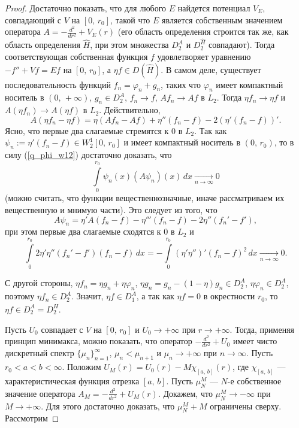 \documentclass[a4paper
]{article}
\begin{document}
\begin{proof}
Достаточно показать, что для любого $E$ найдется потенциал $V_E$,
совпадающий с $V$ на $[0, \, r_0]$, такой что $E$ является
собственным значением оператора $A=-\frac{d^2}{dr^2}+V_E(r)$ (его
область определения строится так же, как область определения $\hat
H$, при этом множества $D_2^A$ и $D_2^{\hat H}$ совпадают). Тогда
соответствующая собственная функция $f$ удовлетворяет уравнению
$-f''+Vf=Ef$ на $[0, \, r_0]$, а $\eta f\in D(\hat H)$. В самом
деле, существует последовательность функций $f_n=\varphi_n+g_n$,
таких что $\varphi_n$ имеет компактный носитель в $(0, \,
+\infty)$, $g_n\in D_2^A$, $f_n\rightarrow f$, $Af_n\rightarrow
Af$ в $L_2$. Тогда $\eta f_n\rightarrow \eta f$ и $A(\eta
f_n)\rightarrow A(\eta f)$ в $L_2$. Действительно, $$A(\eta f_n-
\eta f)=\eta (Af_n-Af)+\eta''(f_n-f)-2(\eta'(f_n-f))'.$$ Ясно,
что первые два слагаемые стремятся к 0 в $L_2$. Так как $\psi_n:=
\eta'(f_n-f)\in W^1_2[0, \, r_0]$ и имеет компактный носитель в
$(0, \, r_0)$, то в силу (\ref{q_phi_w12}) достаточно доказать, что
$$\int \limits_0^{r_0}\psi_n(x)(A\psi_n)(x)\, dx\underset{n\rightarrow
\infty}{\rightarrow} 0$$ (можно считать, что функции вещественнозначные,
иначе рассматриваем их вещественную и мнимую части). Это следует из
того, что $$A\psi_n=\eta' A(f_n-f)-\eta'''(f_n-f)-2\eta''(f_n'-f'),$$
при этом первые два слагаемые сходятся к 0 в $L_2$ и $$\int \limits
_0^{r_0}2\eta'\eta''(f_n'-f')(f_n-f)\, dx=-\int \limits_0^{r_0}
(\eta'\eta'')'(f_n-f)^2\, dx\underset{n\rightarrow \infty}{\rightarrow} 0.$$
\par
С другой стороны, $\eta f_n=\eta g_n+\eta\varphi_n$, $\eta
g_n=g_n- (1-\eta)g_n\in D_2^A$, $\eta \varphi_n\in D_2^A$, поэтому
$\eta f_n \in D_2^A$. Значит, $\eta f\in D_1^A$, а так как $\eta
f=0$ в окрестности $r_0$, то $\eta f\in D_2^A=D_2^{\hat H}$. \par
Пусть $U_0$ совпадает с $V$ на $[0, \, r_0]$ и $U_0\rightarrow
+\infty$ при $r\rightarrow +\infty$. Тогда, применяя принцип
минимакса, можно показать, что оператор $-\frac{d^2}{dr^2}+U_0$
имеет чисто дискретный спектр $\{\mu_n\}_{n=1}^\infty$,
$\mu_n<\mu_{n+1}$ и $\mu_n\rightarrow +\infty$ при $n\rightarrow
\infty$. Пусть $r_0<a<b<\infty$. Положим $U_M(r)=U_0(r)-M\chi_{[a,
\, b]}(r)$, где $\chi_{[a, \, b]}$ --- характеристическая функция
отрезка $[a, \, b]$. Пусть $\mu_N^M$ --- $N$-е собственное
значение оператора $A_M=-\frac{d^2}{dr^2}+U_M(r)$. Докажем, что
$\mu_N^M\rightarrow -\infty$ при $M\rightarrow +\infty$. Для этого
достаточно доказать, что $\mu_N^M+M$ ограничены сверху. Рассмотрим

\end{proof}
\end{document}
